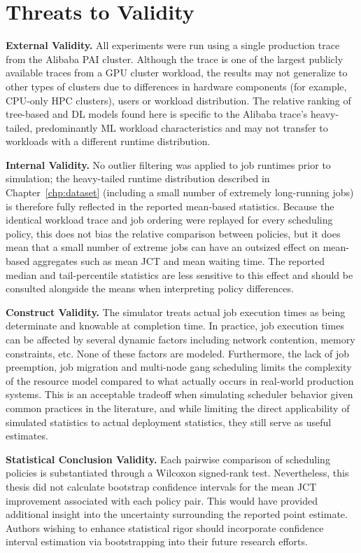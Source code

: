 \section{Threats to Validity}

\textbf{External Validity.} All experiments were run using a single production trace from the Alibaba PAI cluster. Although the trace is one of the largest publicly available traces from a GPU cluster workload, the results may not generalize to other types of clusters due to differences in hardware components (for example, CPU-only HPC clusters), users or workload distribution. The relative ranking of tree-based and DL models found here is specific to the Alibaba trace's heavy-tailed, predominantly ML workload characteristics and may not transfer to workloads with a different runtime distribution.

\textbf{Internal Validity.} No outlier filtering was applied to job runtimes prior to simulation; the heavy-tailed runtime distribution described in Chapter~\ref{chp:dataset} (including a small number of extremely long-running jobs) is therefore fully reflected in the reported mean-based statistics. Because the identical workload trace and job ordering were replayed for every scheduling policy, this does not bias the relative comparison between policies, but it does mean that a small number of extreme jobs can have an outsized effect on mean-based aggregates such as mean JCT and mean waiting time. The reported median and tail-percentile statistics are less sensitive to this effect and should be consulted alongside the means when interpreting policy differences.

\textbf{Construct Validity.} The simulator treats actual job execution times as being determinate and knowable at completion time. In practice, job execution times can be affected by several dynamic factors including network contention, memory constraints, etc. None of these factors are modeled. Furthermore, the lack of job preemption, job migration and multi-node gang scheduling limits the complexity of the resource model compared to what actually occurs in real-world production systems. This is an acceptable tradeoff when simulating scheduler behavior given common practices in the literature, and while limiting the direct applicability of simulated statistics to actual deployment statistics, they still serve as useful estimates.

\textbf{Statistical Conclusion Validity.} Each pairwise comparison of scheduling policies is substantiated through a Wilcoxon signed-rank test. Nevertheless, this thesis did not calculate bootstrap confidence intervals for the mean JCT improvement associated with each policy pair. This would have provided additional insight into the uncertainty surrounding the reported point estimate. Authors wishing to enhance statistical rigor should incorporate confidence interval estimation via bootstrapping into their future research efforts.

